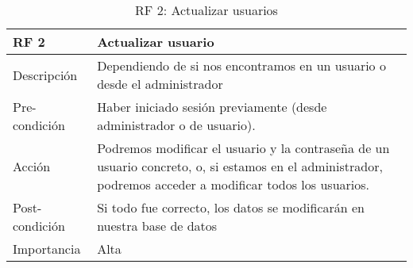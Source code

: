 \begin{table}[htbp]
\begin{center}
\begin{tabular}{|l|p{10cm}|}
\hline
\textbf{RF 2} & \textbf{Actualizar usuario}                                                                                                                              \\ \hline
Descripción   & Dependiendo de si nos encontramos en un usuario o desde el administrador                                                                                 \\ \hline
Pre-condición   & Haber iniciado sesión previamente (desde administrador o de usuario).                                                                                    \\ \hline
Acción        & Podremos modificar el usuario y la contraseña de un usuario concreto, o, si estamos en el administrador, podremos acceder a modificar todos los usuarios. \\ \hline
Post-condición & Si todo fue correcto, los datos se modificarán en nuestra base de datos                                                                                  \\ \hline
Importancia   & Alta                                                                                                                                                     \\ \hline
\end{tabular}
\caption{RF 2: Actualizar usuarios}
	\label{tabla:tablaB2}
	\end{center}
\end{table}

